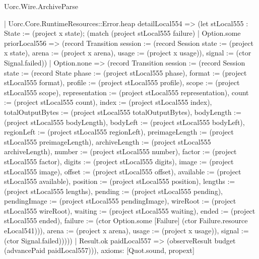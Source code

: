 \begin{lexlean}{Uorc.Wire.ArchiveParse}
\begin{semanticmodule}
{      | Uorc.Core.RuntimeResources::Error.heap detailLocal554 => (let stLocal555 : State := (project x state); (match (project stLocal555 failure)
        | Option.some priorLocal556 => (record Transition {session := (record Session {state := (project x state), arena := (project x arena), usage := (project x usage)}), signal := (ctor Signal.failed)})
        | Option.none => (record Transition {session := (record Session {state := (record State {phase := (project stLocal555 phase), format := (project stLocal555 format), profile := (project stLocal555 profile), scope := (project stLocal555 scope), representation := (project stLocal555 representation), count := (project stLocal555 count), index := (project stLocal555 index), totalOutputBytes := (project stLocal555 totalOutputBytes), bodyLength := (project stLocal555 bodyLength), bodyLeft := (project stLocal555 bodyLeft), regionLeft := (project stLocal555 regionLeft), preimageLength := (project stLocal555 preimageLength), archiveLength := (project stLocal555 archiveLength), number := (project stLocal555 number), factor := (project stLocal555 factor), digits := (project stLocal555 digits), image := (project stLocal555 image), offset := (project stLocal555 offset), available := (project stLocal555 available), position := (project stLocal555 position), lengths := (project stLocal555 lengths), pending := (project stLocal555 pending), pendingImage := (project stLocal555 pendingImage), wireRoot := (project stLocal555 wireRoot), waiting := (project stLocal555 waiting), ended := (project stLocal555 ended), failure := (ctor Option.some [Failure] (ctor Failure.resource eLocal541))}), arena := (project x arena), usage := (project x usage)}), signal := (ctor Signal.failed)}))))
    | Result.ok paidLocal557 => (observeResult budget (advancePaid paidLocal557))),
  axioms: [Quot.sound, propext]
}


\end{semanticmodule}
\end{lexlean}
